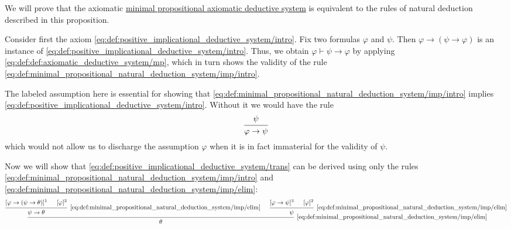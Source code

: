 \begin{defproof}
  We will prove that the axiomatic \hyperref[def:minimal_propositional_axiomatic_deductive_system]{minimal propositional axiomatic deductive system} is equivalent to the rules of natural deduction described in this proposition.

   Consider first the axiom \eqref{eq:def:positive_implicational_deductive_system/intro}. Fix two formulas \( \varphi \) and \( \psi \). Then \( \varphi \rightarrow (\psi \rightarrow \varphi) \) is an instance of \eqref{eq:def:positive_implicational_deductive_system/intro}. Thus, we obtain \( \varphi \vdash \psi \rightarrow \varphi \) by applying \eqref{eq:def:def:axiomatic_deductive_system/mp}, which in turn shows the validity of the rule \eqref{eq:def:minimal_propositional_natural_deduction_system/imp/intro}.

  The labeled assumption here is essential for showing that \eqref{eq:def:minimal_propositional_natural_deduction_system/imp/intro} implies \eqref{eq:def:positive_implicational_deductive_system/intro}. Without it we would have the rule
  \begin{equation*}
    \begin{prooftree}
      \hypo{ \psi }
      \infer1{ \varphi \rightarrow \psi }
    \end{prooftree}
  \end{equation*}
  which would not allow us to discharge the assumption \( \varphi \) when it is in fact immaterial for the validity of \( \psi \).

  Now we will show that \eqref{eq:def:positive_implicational_deductive_system/trans} can be derived using only the rules \eqref{eq:def:minimal_propositional_natural_deduction_system/imp/intro} and \eqref{eq:def:minimal_propositional_natural_deduction_system/imp/elim}:
  \begin{equation}\label{eq:def:minimal_propositional_natural_deduction_system/imp/trans_derivation}
    \begin{prooftree}
      \hypo{ [\varphi \rightarrow (\psi \rightarrow \theta)]^1 }
      \hypo{ [\varphi]^2 }
      \infer2[\ref{eq:def:minimal_propositional_natural_deduction_system/imp/elim}]{ \psi \rightarrow \theta }

      \hypo{ [\varphi \rightarrow \psi]^3 }
      \hypo{ [\varphi]^2 }
      \infer2[\ref{eq:def:minimal_propositional_natural_deduction_system/imp/elim}]{ \psi }

      \infer2[\ref{eq:def:minimal_propositional_natural_deduction_system/imp/elim}]{ \theta }


\end{prooftree}
\end{equation}
\end{defproof}
